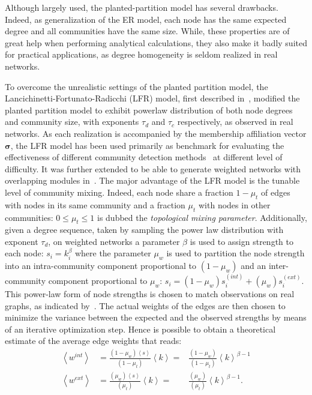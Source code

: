 Although largely used, the planted-partition model has several drawbacks.
Indeed, as generalization of the ER model, each node has the same expected degree and all communities have the same size.
While, these properties are of great help when performing analytical calculations, they also make it badly suited for practical applications, as degree homogeneity is seldom realized in real networks.

To overcome the unrealistic settings of the planted partition model, the Lancichinetti\hyp{}Fortunato\hyp{}Radicchi (LFR) model, first described in~\cite{lancichinetti2008}, modified the planted partition model to exhibit powerlaw distribution of both node degrees and community size, with exponents $\tau_d$ and $\tau_c$ respectively, as observed in real networks.
As each realization is accompanied by the membership affiliation vector $\boldsymbol \sigma$, the LFR model has been used primarily as benchmark for evaluating the effectiveness of different community detection methods~\cite{fortunato2010,lancichinetti2009} at different level of difficulty. It was further extended to be able to generate weighted networks with overlapping modules in~\cite{lancichinetti2009a}.
The major advantage of the LFR model is the tunable level of community mixing. Indeed, each node share a fraction $1-\mu_t$ of edges with nodes in its same community and a fraction $\mu_t$ with nodes in other communities: $0 \leq \mu_t \leq 1$ is dubbed the \emph{topological mixing parameter}.
Additionally, given a degree sequence, taken by sampling the power law distribution with exponent $\tau_d$, on weighted networks a parameter $\beta$ is used to assign strength to each node: $s_i=k_i^\beta$ where the parameter $\mu_w$ is used to partition the node strength into an intra-community component proportional to $(1-\mu_w)$ and an inter-community component proportional to $\mu_w$: $s_i = (1-\mu_w)s_i^{(int)} + (\mu_w)s_i^{(ext)}$. This power-law form of node strengths is chosen to match observations on real graphs, as indicated by~\cite{barrat2004}.
The actual weights of the edges are then chosen to minimize the variance between the expected and the observed strengths by means of an iterative optimization step. Hence is possible to obtain a theoretical estimate of the average edge weights that reads:
\begin{align}
\left< w^{int} \right> &= \frac{(1-\mu_w)\left< s\right>}{(1-\mu_t)}\left< k\right> =& \frac{(1-\mu_w)}{(1-\mu_t)}\left < k \right>^{\beta-1} \\
\left< w^{ext} \right> &= \frac{(\mu_w)\left< s\right>}{(\mu_t)}\left< k\right> =& \frac{(\mu_w)}{(\mu_t)}\left < k \right>^{\beta-1}.
\end{align}
